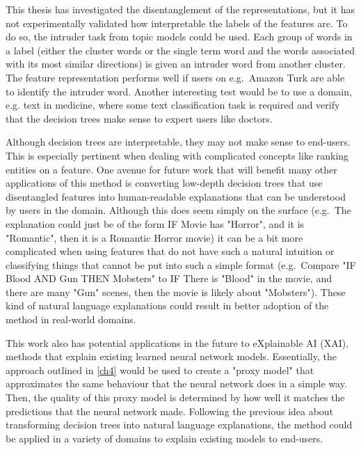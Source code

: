 
This thesis has investigated the disentanglement of the representations, but it has not experimentally validated how interpretable the  labels of the features  are. To do so, the intruder task from topic models could be used. Each group of words in a label (either the cluster words or the single term word and the words associated with its most similar directions) is given an intruder word from another cluster. The feature representation performs well if users on e.g.\ Amazon Turk are able to identify the intruder word. Another interesting test would be to use a domain, e.g. text in medicine, where some text classification task is required and verify that the decision trees make sense to expert users like doctors. 



Although decision trees are interpretable, they may not make sense to end-users. This is especially pertinent when dealing with complicated concepts like ranking entities on a feature. One avenue for future work that will benefit many other applications of this method is converting low-depth decision trees that use disentangled features into human-readable explanations that can be understood by users in the domain. Although this does seem simply on the surface (e.g.\ The explanation could just be of the form IF Movie has "Horror", and it is "Romantic", then it is a Romantic Horror movie) it can be a bit more complicated when using features that do not have such a natural intuition or classifying things that cannot be put into such a simple format (e.g.\ Compare "IF Blood AND Gun THEN Mobsters" to IF There is "Blood" in the movie, and there are many "Gun" scenes, then the movie is likely about "Mobsters"). These kind of natural language explanations could result in better adoption of the method in real-world domains.


This work also has potential applications in the future to eXplainable AI (XAI), methods that explain existing learned neural network models. Essentially, the approach outlined in \ref{ch4} would be used to create a "proxy model" that approximates the same behaviour that the neural network does in a simple way. Then, the quality of this proxy model is determined by how well it matches the predictions that the neural network made. Following the previous idea about transforming decision trees into natural language explanations, the method could be applied in a variety of domains to explain existing models to end-users.

